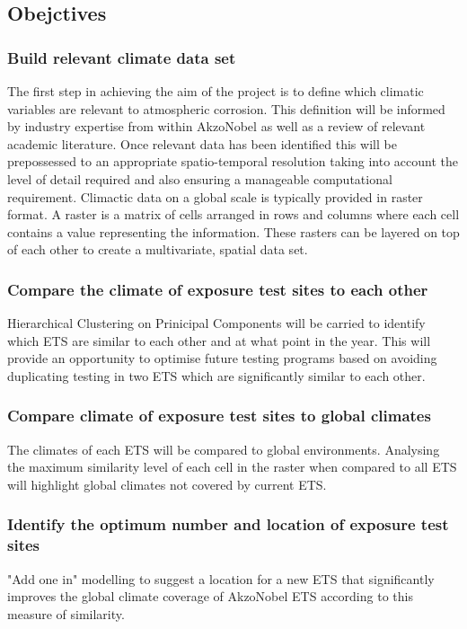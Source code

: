\documentclass{article}
\begin{document}
\subsection{Obejctives}
\subsubsection{Build relevant climate data set}
The first step in achieving the aim of the project is to define which climatic variables are relevant to atmospheric corrosion. This definition will be informed by industry expertise from within AkzoNobel as well as a review of relevant academic literature. Once relevant data has been identified this will be prepossessed to an appropriate spatio-temporal resolution taking into account the level of detail required and also ensuring a manageable computational requirement. Climactic data on a global scale is typically provided in raster format. A raster is a matrix of cells arranged in rows and columns where each cell contains a value representing the information. These rasters can be layered on top of each other to create a multivariate, spatial data set.   

\subsubsection{Compare the climate of exposure test sites to each other}
Hierarchical Clustering on Prinicipal Components will be carried to identify which ETS are similar to each other and at what point in the year. This will provide an opportunity to optimise future testing programs based on avoiding duplicating testing in two ETS which are significantly similar to each other. 

\subsubsection{Compare climate of exposure test sites to global climates}
The climates of each ETS will be compared to global environments. Analysing the maximum similarity level of each cell in the raster when compared to all ETS will highlight global climates not covered by current ETS.   

\subsubsection{Identify the optimum number and location of exposure test sites}
"Add one in" modelling to suggest a location for a new ETS that significantly improves the global climate coverage of AkzoNobel ETS according to this measure of similarity. 
\end{document}
